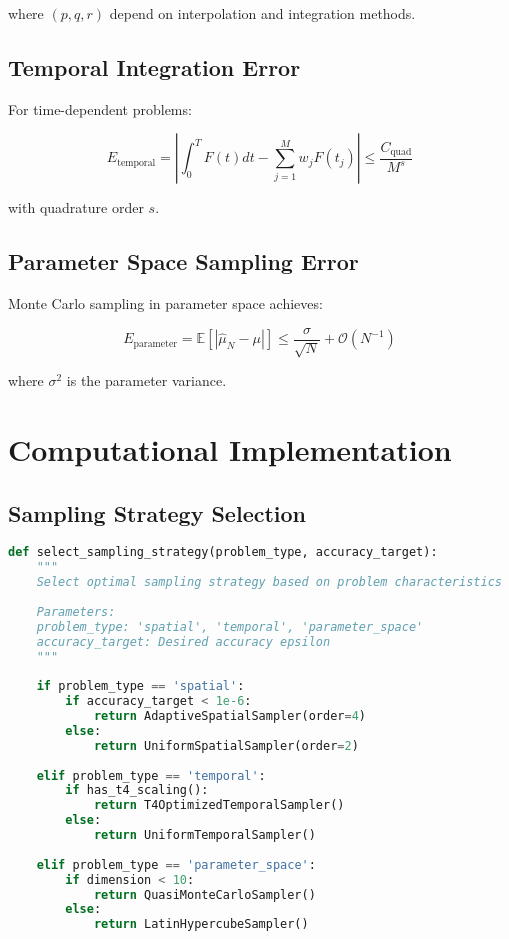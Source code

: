 \documentclass[12pt,a4paper]{article}
\begin{document}
where $(p,q,r)$ depend on interpolation and integration methods.

\subsection{Temporal Integration Error}

For time-dependent problems:

\begin{equation}
E_{\text{temporal}} = \left|\int_0^T F(t) dt - \sum_{j=1}^M w_j F(t_j)\right| \leq \frac{C_{\text{quad}}}{M^s}
\end{equation}

with quadrature order $s$.

\subsection{Parameter Space Sampling Error}

Monte Carlo sampling in parameter space achieves:

\begin{equation}
E_{\text{parameter}} = \mathbb{E}[|\hat{\mu}_N - \mu|] \leq \frac{\sigma}{\sqrt{N}} + \mathcal{O}(N^{-1})
\end{equation}

where $\sigma^2$ is the parameter variance.

\section{Computational Implementation}

\subsection{Sampling Strategy Selection}

\begin{lstlisting}[language=Python]
def select_sampling_strategy(problem_type, accuracy_target):
    """
    Select optimal sampling strategy based on problem characteristics
    
    Parameters:
    problem_type: 'spatial', 'temporal', 'parameter_space'
    accuracy_target: Desired accuracy epsilon
    """
    
    if problem_type == 'spatial':
        if accuracy_target < 1e-6:
            return AdaptiveSpatialSampler(order=4)
        else:
            return UniformSpatialSampler(order=2)
    
    elif problem_type == 'temporal':
        if has_t4_scaling():
            return T4OptimizedTemporalSampler()
        else:
            return UniformTemporalSampler()
    
    elif problem_type == 'parameter_space':
        if dimension < 10:
            return QuasiMonteCarloSampler()
        else:
            return LatinHypercubeSampler()
\end{lstlisting}
\end{document}
